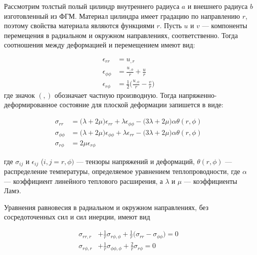 Рассмотрим толстый полый цилиндр внутреннего радиуса \(a\) и внешнего радиуса \(b\) изготовленный из ФГМ. Материал цилиндра имеет градацию по направлению \(r\), поэтому свойства материала являются функциями \(r\). Пусть \(u\) и \(v\) --- компоненты перемещения в радиальном и окружном направлениях, соответственно. Тогда соотношения между деформацией и перемещением имеют вид:

\begin{equation}
	\label{eq:ch2:equation1}
	\begin{split}
		\epsilon_{rr} & = u_{,r}\\
		\epsilon_{\phi\phi} &= \frac{u_{,\phi}}{r} + \frac{u}{r}\\
		\epsilon_{r \phi} &= \frac{1}{2} \big(\frac{u_{,\phi}}{r} - \frac{v}{r} \big)
	\end{split}
\end{equation}
где значок \((,)\) обозначает частную производную. Тогда напряженно-деформированное состояние для плоской деформации запишется в виде:

\begin{equation}
	\label{eq:ch2:equation2}
	\begin{split}
		\sigma_{rr} &= \big(\lambda + 2 \mu \big) \epsilon_{rr} + \lambda \epsilon_{\phi\phi} - \big(3 \lambda +2 \mu \big) \alpha \theta (r, \phi)\\
		\sigma_{\phi\phi} &= \big(\lambda + 2 \mu \big) \epsilon_{\phi \phi} + \lambda \epsilon_{rr} - \big(3 \lambda +2 \mu \big) \alpha \theta (r, \phi)\\
		\sigma_{r \phi} &= 2\mu \epsilon_{r \phi}
	\end{split}
\end{equation}

где \(\sigma_{ij}\) и \(\epsilon_{ij}\) (\(i,j = r,\phi)\) --- тензоры напряжений и деформаций, \(\theta (r, \phi) \) --- распределение температуры, определяемое уравнением теплопроводности, где \(\alpha \) --- коэффициент линейного теплового расширения, а \( \lambda \) и \(\mu \) --- коэффициенты Ламэ.

Уравнения равновесия в радиальном и окружном направлениях, без сосредоточенных сил и сил инерции, имеют вид


\begin{equation}
	\label{eq:ch2:equation3}
	\begin{split}
		\sigma_{rr,r} &+ \frac{1}{r} \sigma_{r \phi, \phi} + \frac{1}{r} \big ( \sigma_{rr} - \sigma_{\phi\phi}\big ) = 0 \\
		\sigma_{r \phi, r} &+ \frac{1}{r} \sigma_{\phi \phi, \phi} + \frac{2}{r} \sigma_{r \phi} = 0
	\end{split}
\end{equation}


